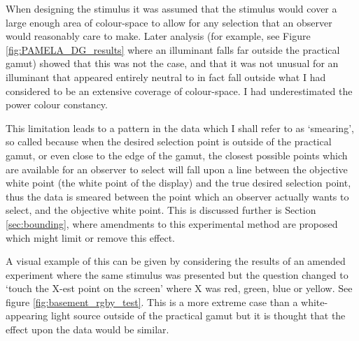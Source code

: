 When designing the stimulus it was assumed that the stimulus would cover a large enough area of colour-space to allow for any selection that an observer would reasonably care to make. Later analysis (for example, see Figure \ref{fig:PAMELA_DG_results} where an illuminant falls far outside the practical gamut) showed that this was not the case, and that it was not unusual for an illuminant that appeared entirely neutral to in fact fall outside what I had considered to be an extensive coverage of colour-space. I had underestimated the power colour constancy.

This limitation leads to a pattern in the data which I shall refer to as `smearing', so called because when the desired selection point is outside of the practical gamut, or even close to the edge of the gamut, the closest possible points which are available for an observer to select will fall upon a line between the objective white point (the white point of the display) and the true desired selection point, thus the data is smeared between the point which an observer actually wants to select, and the objective white point. This is discussed further is Section \ref{sec:bounding}, where amendments to this experimental method are proposed which might limit or remove this effect.

A visual example of this can be given by considering the results of an amended experiment where the same stimulus was presented but the question changed to `touch the X-est point on the screen' where X was red, green, blue or yellow. See figure \ref{fig:basement_rgby_test}. This is a more extreme case than a white-appearing light source outside of the practical gamut but it is thought that the effect upon the data would be similar.

